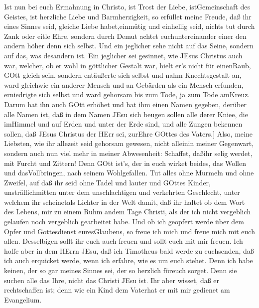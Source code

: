  Ist nun bei euch Ermahnung in Christo, ist Trost der Liebe,
istGemeinschaft des Geistes, ist herzliche Liebe und Barmherzigkeit,
 so erfüllet meine Freude, daß ihr eines Sinnes seid,
gleiche Liebe habet,einmütig und einhellig seid,  nichts tut
durch Zank oder eitle Ehre, sondern durch Demut achtet euchuntereinander
einer den andern höher denn sich selbst.  Und ein jeglicher
sehe nicht auf das Seine, sondern auf das, was desandern ist.
 Ein jeglicher sei gesinnet, wie JEsus Christus auch war,
 welcher, ob er wohl in göttlicher Gestalt war, hielt er's
nicht für einenRaub, GOtt gleich sein,  sondern entäußerte
sich selbst und nahm Knechtsgestalt an, ward gleichwie ein anderer
Mensch und an Gebärden als ein Mensch erfunden,  erniedrigte
sich selbst und ward gehorsam bis zum Tode, ja zum Tode amKreuz.
 Darum hat ihn auch GOtt erhöhet und hat ihm einen Namen
gegeben, derüber alle Namen ist,  daß in dem Namen JEsu
sich beugen sollen alle derer Kniee, die imHimmel und auf Erden und
unter der Erde sind,  und alle Zungen bekennen sollen, daß
JEsus Christus der HErr sei, zurEhre GOttes des Vaters.{]} 
Also, meine Liebsten, wie ihr allezeit seid gehorsam gewesen, nicht
alleinin meiner Gegenwart, sondern auch nun viel mehr in meiner
Abwesenheit: Schaffet, daßihr selig werdet, mit Furcht und Zittern!
 Denn GOtt ist's, der in euch wirket beides, das Wollen und
dasVollbringen, nach seinem Wohlgefallen.  Tut alles ohne
Murmeln und ohne Zweifel,  auf daß ihr seid ohne Tadel und
lauter und GOttes Kinder, unsträflichmitten unter dem unschlachtigen und
verkehrten Geschlecht, unter welchem ihr scheinetals Lichter in der Welt
 damit, daß ihr haltet ob dem Wort des Lebens, mir zu einem
Ruhm andem Tage Christi, als der ich nicht vergeblich gelaufen noch
vergeblich gearbeitet habe.  Und ob ich geopfert werde über
dem Opfer und Gottesdienst euresGlaubens, so freue ich mich und freue
mich mit euch allen.  Desselbigen sollt ihr euch auch
freuen und sollt euch mit mir freuen.  Ich hoffe aber in
dem HErrn JEsu, daß ich Timotheus bald werde zu euchsenden, daß ich auch
erquicket werde, wenn ich erfahre, wie es um euch stehet. 
Denn ich habe keinen, der so gar meines Sinnes sei, der so herzlich
füreuch sorget.  Denn sie suchen alle das Ihre, nicht das
Christi JEsu ist.  Ihr aber wisset, daß er rechtschaffen
ist; denn wie ein Kind dem Vaterhat er mit mir gedienet am Evangelium.

